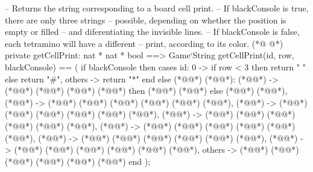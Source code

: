 \begin{vdmpp}[breaklines=true]
  -- Returns the string corresponding to a board cell print.
  -- If blackConsole is true, there are only three strings
  -- possible, depending on whether the position is empty or filled
  -- and diferentiating the invisible lines.
  -- If blackConsole is false, each tetramino will have a different
  -- print, according to its color.
(*@
\label{getCellPrint:82}
@*)
  private getCellPrint: nat * nat * bool ==> Game`String
  getCellPrint(id, row, blackConsole) == (
   if blackConsole then
    cases id:
     0 -> if row < 3 then return " " else return "#",
     others -> return "*"
    end
   else
    (*@@*) (*@@*):
     (*@@*) -> (*@@*) (*@@*) (*@\vdmnotcovered{<}@*) (*@@*) then (*@@*) (*@@*) else (*@@*) (*@@*),
     (*@@*) -> (*@@*) (*@\vdmnotcovered{"\textbackslash u001B[38;5;51m"}@*) (*@\vdmnotcovered{\^{}}@*) (*@@*) (*@\vdmnotcovered{\^{}}@*) (*@\vdmnotcovered{"\textbackslash u001B[0m"}@*),
     (*@@*) -> (*@@*) (*@\vdmnotcovered{"\textbackslash u001B[38;5;21m"}@*) (*@\vdmnotcovered{\^{}}@*) (*@@*) (*@\vdmnotcovered{\^{}}@*) (*@\vdmnotcovered{"\textbackslash u001B[0m"}@*),
     (*@@*) -> (*@@*) (*@\vdmnotcovered{"\textbackslash u001B[38;5;208m"}@*) (*@\vdmnotcovered{\^{}}@*) (*@@*) (*@\vdmnotcovered{\^{}}@*) (*@\vdmnotcovered{"\textbackslash u001B[0m"}@*),
     (*@@*) -> (*@@*) (*@\vdmnotcovered{"\textbackslash u001B[38;5;226m"}@*) (*@\vdmnotcovered{\^{}}@*) (*@@*) (*@\vdmnotcovered{\^{}}@*) (*@\vdmnotcovered{"\textbackslash u001B[0m"}@*),
     (*@@*) -> (*@@*) (*@\vdmnotcovered{"\textbackslash u001B[38;5;34m"}@*) (*@\vdmnotcovered{\^{}}@*) (*@@*) (*@\vdmnotcovered{\^{}}@*) (*@\vdmnotcovered{"\textbackslash u001B[0m"}@*),
     (*@@*) -> (*@@*) (*@\vdmnotcovered{"\textbackslash u001B[38;5;165m"}@*) (*@\vdmnotcovered{\^{}}@*) (*@@*) (*@\vdmnotcovered{\^{}}@*) (*@\vdmnotcovered{"\textbackslash u001B[0m"}@*),
     others -> (*@@*) (*@\vdmnotcovered{"\textbackslash u001B[38;5;196m"}@*) (*@\vdmnotcovered{\^{}}@*) (*@@*) (*@\vdmnotcovered{\^{}}@*) (*@\vdmnotcovered{"\textbackslash u001B[0m"}@*)    
    end
  );
  

\end{vdmpp}
